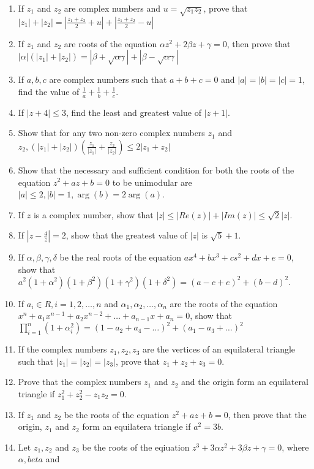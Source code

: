\begin{enumerate}[resume]
\item If $z_1$ and $z_2$ are complex numbers and $u = \sqrt{z_1z_2}$, prove that $|z_1| + |z_2| = \left|\frac{z_1 + z_2}{2} +
  u\right| + \left|\frac{z_1 + z_2}{2} - u\right|$
\item If $z_1$ and $z_2$ are roots of the equation $\alpha z^2 + 2\beta z + \gamma = 0$, then prove that $|\alpha|(|z_1| + |z_2|) =
  |\beta + \sqrt{\alpha\gamma}| + |\beta - \sqrt{\alpha\gamma}|$
\item If $a, b, c$ are complex numbers such that $a + b + c = 0$ and $|a| = |b| = |c| = 1$, find the value of $\frac{1}{a} +
  \frac{1}{b} + \frac{1}{c}$.
\item If $|z + 4|\leq 3$, find the least and greatest value of $|z + 1|$.
\item Show that for any two non-zero complex numbers $z_1$ and $z_2, (|z_1| + |z_2|)\left(\frac{z_1}{|z_1|} +
  \frac{z_2}{|z_2|}\right) \leq 2|z_1 + z_2|$
\item Show that the necessary and sufficient condition for both the roots of the equation $z^2 + az + b = 0$ to be unimodular are
  $|a|\leq 2, |b| = 1, \arg(b) = 2\arg(a)$.
\item If $z$ is a complex number, show that $|z|\leq |Re(z)| + |Im(z)|\leq \sqrt{2}|z|$.
\item If $|z - \frac{4}{z}| = 2$, show that the greatest value of $|z|$ is $\sqrt{5} + 1$.
\item If $\alpha, \beta, \gamma, \delta$ be the real roots of the equation $ax^4 + bx^3 + cs^2 + dx + e = 0$, show that $a^2(1 +
  \alpha^2)(1 + \beta^2)(1 + \gamma^2)(1 + \delta^2) = (a - c + e)^2 + (b - d)^2$.
\item If $a_i\in R, i = 1, 2, \ldots, n$ and $\alpha_1, \alpha_2, \ldots, \alpha_n$ are the roots of the equation $x^n + a_1x^{n -
  1} + a_2x^{n - 2} + \ldots + a_{n- 1}x + a_n = 0$, show that $\prod_{i = 1}^n(1 + \alpha_i^2) = (1 - a_2 + a_4 - \ldots)^2 + (a_1
  - a_3 + \ldots)^2$
\item If the complex numbers $z_1, z_2, z_3$ are the vertices of an equilateral triangle such that $|z_1| = |z_2| = |z_3|$, prove
  that $z_1 + z_2 + z_3 = 0$.
\item Prove that the complex numbers $z_1$ and $z_2$ and the origin form an equilateral triangle if $z_1^2 + z_2^2 - z_1z_2 = 0$.
\item If $z_1$ and $z_2$ be the roots of the equation $z^2 + az + b = 0$, then prove that the origin, $z_1$ and $z_2$ form an
  equilatera triangle if $a^2 = 3b$.
\item Let $z_1, z_2$ and $z_3$ be the roots of the eqiuation $z^3 + 3\alpha z^2 + 3\beta z + \gamma = 0$, where $\alpha, beta$ and

\end{enumerate}
